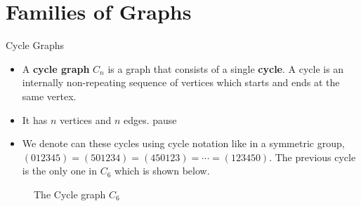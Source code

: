 \documentclass{beamer}
\theoremstyle{plain}
\begin{document}
\section{Families of Graphs}

\begin{frame}{Cycle Graphs}
\pause
    \begin{itemize}
        \item A \textbf{cycle graph} $C_n$ is a graph that consists of a single \textbf{cycle}. A cycle is an internally non-repeating sequence of vertices which starts and ends at the same vertex.
        \pause
        \item It has $n$ vertices and $n$ edges.
        pause
        \item We denote can these cycles using cycle notation like in a symmetric group, $(012345)=(501234)=(450123)=\cdots=(123450)$. The previous cycle is the only one in $C_{6}$ which is shown below.
    \end{itemize}
    \pause
    \begin{figure}
        \centering
        \caption{The Cycle graph $C_6$}
    \end{figure}
\end{frame}
\end{document}
